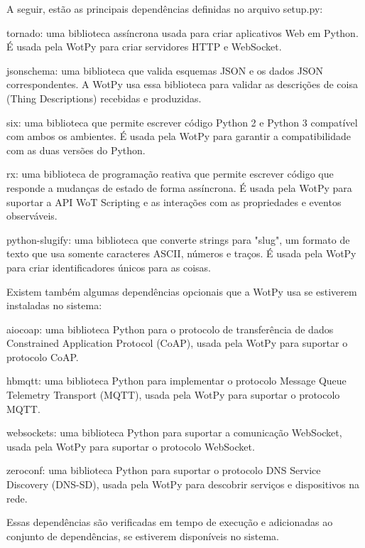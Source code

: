 A seguir, estão as principais dependências definidas no arquivo setup.py:

tornado: uma biblioteca assíncrona usada para criar aplicativos Web em Python. É usada pela WotPy para criar servidores HTTP e WebSocket.

jsonschema: uma biblioteca que valida esquemas JSON e os dados JSON correspondentes. A WotPy usa essa biblioteca para validar as descrições de coisa (Thing Descriptions) recebidas e produzidas.

six: uma biblioteca que permite escrever código Python 2 e Python 3 compatível com ambos os ambientes. É usada pela WotPy para garantir a compatibilidade com as duas versões do Python.

rx: uma biblioteca de programação reativa que permite escrever código que responde a mudanças de estado de forma assíncrona. É usada pela WotPy para suportar a API WoT Scripting e as interações com as propriedades e eventos observáveis.

python-slugify: uma biblioteca que converte strings para "slug", um formato de texto que usa somente caracteres ASCII, números e traços. É usada pela WotPy para criar identificadores únicos para as coisas.

Existem também algumas dependências opcionais que a WotPy usa se estiverem instaladas no sistema:

aiocoap: uma biblioteca Python para o protocolo de transferência de dados Constrained Application Protocol (CoAP), usada pela WotPy para suportar o protocolo CoAP.

hbmqtt: uma biblioteca Python para implementar o protocolo Message Queue Telemetry Transport (MQTT), usada pela WotPy para suportar o protocolo MQTT.

websockets: uma biblioteca Python para suportar a comunicação WebSocket, usada pela WotPy para suportar o protocolo WebSocket.

zeroconf: uma biblioteca Python para suportar o protocolo DNS Service Discovery (DNS-SD), usada pela WotPy para descobrir serviços e dispositivos na rede.

Essas dependências são verificadas em tempo de execução e adicionadas ao conjunto de dependências, se estiverem disponíveis no sistema.
